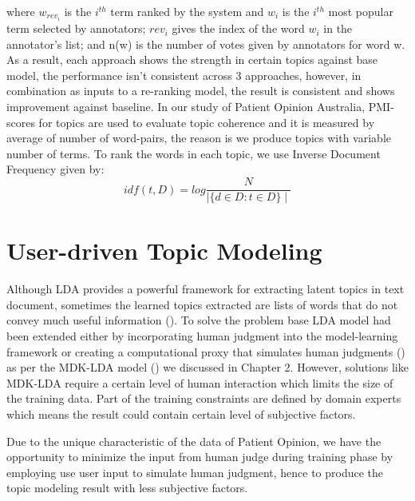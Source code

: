 \documentclass[11pt,twoside]{report}
\begin{document}
where $w_{rev_{i}}$ is the $i^{th}$ term ranked by the system and $w_i$ is the $i^{th}$ most popular term selected by annotators; $rev_{i}$ gives the index of the word $w_i$ in the annotator's list; and n(w) is the number of votes given by annotators for word w. As a result, each approach shows the strength in certain topics against base model, the performance isn't consistent across 3 approaches, however, in combination as inputs to a re-ranking model, the result is consistent and shows improvement against baseline. In our study of Patient Opinion Australia, PMI-scores for topics are used to evaluate topic coherence and it is measured by average of number of word-pairs, the reason is we produce topics with variable number of terms. To rank the words in each topic, we use Inverse Document Frequency given by:
\begin{equation}
idf(t, D) = log\frac{N}{\mid \{d\in D : t\in D\}\mid}
\end{equation}

\chapter{User-driven Topic Modeling}

Although LDA provides a powerful framework for extracting latent topics in text document, sometimes the learned topics extracted are lists of words that do not convey much useful information (\cite{ref26}). To solve the problem base LDA model had been extended either by incorporating human judgment into the model-learning framework or creating a computational proxy that simulates human judgments (\cite{ref28}) as per the MDK-LDA model (\cite{ref24}) we discussed in Chapter 2. However, solutions like MDK-LDA require a certain level of human interaction which limits the size of the training data. Part of the training constraints are defined by domain experts which means the result could contain certain level of subjective factors.

Due to the unique characteristic of the data of Patient Opinion, we have the opportunity to minimize the input from human judge during training phase by employing use user input to simulate human judgment, hence to produce the topic modeling result with less subjective factors.

\end{document}

